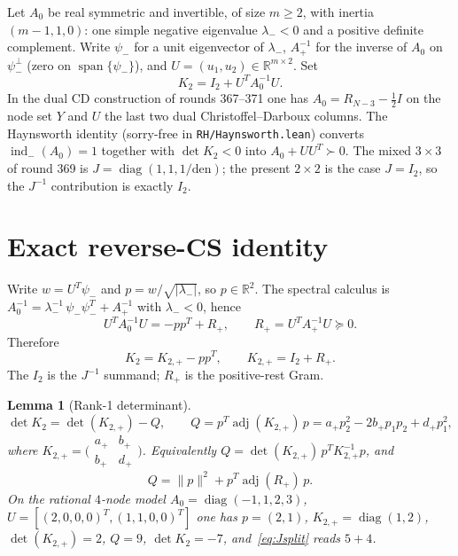 \documentclass[11pt]{article}
\newtheorem{lemma}{Lemma}
\theoremstyle{remark}
\newcommand{\half}{\tfrac12}
\newcommand{\R}{\mathbb{R}}
\newcommand{\lam}{\lambda_{-}}
\newcommand{\psim}{\psi_{-}}
\newcommand{\Rp}{R_{+}}
\newcommand{\Kp}{K_{2,+}}
\newcommand{\indm}{\operatorname{ind}_{-}}
\begin{document}
Let $A_{0}$ be real symmetric and invertible, of size $m\ge 2$,
with inertia $(m-1,1,0)$: one simple negative eigenvalue $\lam<0$
and a positive definite complement.  Write $\psim$ for a unit
eigenvector of $\lam$, $A_{+}^{-1}$ for the inverse of $A_{0}$ on
$\psim^{\perp}$ (zero on $\operatorname{span}\{\psim\}$), and
$U=(u_{1},u_{2})\in\R^{m\times 2}$.  Set
\[
K_{2}=I_{2}+U^{T}A_{0}^{-1}U.
\]
In the dual CD construction of rounds 367--371 one has
$A_{0}=R_{N-3}-\half I$ on the node set $Y$ and $U$ the last two
dual Christoffel--Darboux columns.  The Haynsworth identity
(sorry-free in \texttt{RH/Haynsworth.lean}) converts
$\indm(A_{0})=1$ together with $\det K_{2}<0$ into
$A_{0}+UU^{T}\succ 0$.  The mixed $3\times 3$ of round 369 is
$J=\operatorname{diag}(1,1,1/\mathrm{den})$; the present $2\times 2$
is the case $J=I_{2}$, so the $J^{-1}$ contribution is exactly $I_{2}$.

\section{Exact reverse-CS identity}\label{sec:id}

Write $w=U^{T}\psim$ and
$p=w/\sqrt{|\lam|}$, so $p\in\R^{2}$.  The spectral calculus is
$A_{0}^{-1}=\lam^{-1}\,\psim\psim^{T}+A_{+}^{-1}$ with $\lam<0$, hence
\[
U^{T}A_{0}^{-1}U
=-pp^{T}+\Rp,
\qquad
\Rp=U^{T}A_{+}^{-1}U\succeq 0.
\]
Therefore
\begin{equation}\label{eq:split}
K_{2}
=\Kp-pp^{T},
\qquad
\Kp=I_{2}+\Rp.
\end{equation}
The $I_{2}$ is the $J^{-1}$ summand; $\Rp$ is the positive-rest Gram.

\begin{lemma}[Rank-1 determinant]\label{lem:id}
\[
\det K_{2}
=\det(\Kp)-Q,
\qquad
Q=p^{T}\operatorname{adj}(\Kp)\,p
=a_{+}p_{2}^{2}-2b_{+}p_{1}p_{2}+d_{+}p_{1}^{2},
\]
where $\Kp=\bigl(\begin{smallmatrix}a_{+}&b_{+}\\ b_{+}&d_{+}\end{smallmatrix}\bigr)$.
Equivalently $Q=\det(\Kp)\,p^{T}\Kp^{-1}p$, and
\begin{equation}\label{eq:Jsplit}
Q
=\|p\|^{2}+p^{T}\operatorname{adj}(\Rp)\,p.
\end{equation}
On the rational $4$-node model
$A_{0}=\operatorname{diag}(-1,1,2,3)$,
$U=[(2,0,0,0)^{T},(1,1,0,0)^{T}]$ one has $p=(2,1)$,
$\Kp=\operatorname{diag}(1,2)$, $\det(\Kp)=2$, $Q=9$,
$\det K_{2}=-7$, and~\eqref{eq:Jsplit} reads $5+4$.
\end{lemma}
\end{document}
